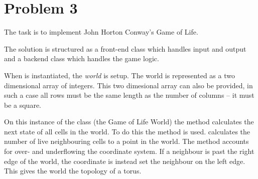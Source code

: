 \section*{Problem 3}

The task is to implement John Horton Conway's Game of Life.

The solution is structured as a front-end class  which
handles input and output and a backend class  which handles
the game logic.

When  is instantiated, the \emph{world} is setup. The world
is represented as a two dimensional array of integers. This two dimesional
array can also be provided, in such a case all rows must be the same length as
the number of columns -- it must be a square.

On this instance of the class (the Game of Life World) the method
 calculates the next state of all cells in the world. To do
this the method  is used. 
calculates the number of live neighbouring cells to a point in the world. The
method accounts for over- and underflowing the coordinate system. If a
neighbour is past the right edge of the world, the coordinate is instead set
the neighbour on the left edge. This gives the world the topology of a torus.

